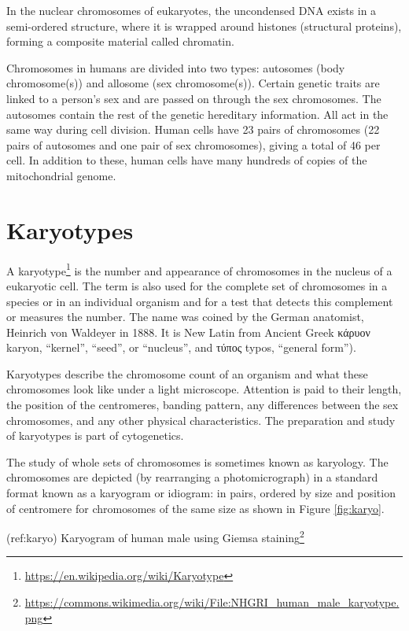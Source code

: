 \documentclass[]{book}
\let\rmarkdownfootnote\footnote%
\def\footnote{\protect\rmarkdownfootnote}
\renewcommand{\href}[2]{#2\footnote{\url{#1}}}
\theoremstyle{definition}
\theoremstyle{definition}
\theoremstyle{definition}
\theoremstyle{remark}
\begin{document}
In the nuclear chromosomes of eukaryotes, the uncondensed DNA exists in
a semi-ordered structure, where it is wrapped around histones
(structural proteins), forming a composite material called chromatin.

Chromosomes in humans are divided into two types: autosomes (body
chromosome(s)) and allosome (sex chromosome(s)). Certain genetic traits
are linked to a person's sex and are passed on through the sex
chromosomes. The autosomes contain the rest of the genetic hereditary
information. All act in the same way during cell division. Human cells
have 23 pairs of chromosomes (22 pairs of autosomes and one pair of sex
chromosomes), giving a total of 46 per cell. In addition to these, human
cells have many hundreds of copies of the mitochondrial genome.

\section{Karyotypes}\label{karyotypes}

A \href{https://en.wikipedia.org/wiki/Karyotype}{karyotype} is the
number and appearance of chromosomes in the nucleus of a eukaryotic
cell. The term is also used for the complete set of chromosomes in a
species or in an individual organism and for a test that detects this
complement or measures the number. The name was coined by the German
anatomist, Heinrich von Waldeyer in 1888. It is New Latin from Ancient
Greek κάρυον karyon, ``kernel'', ``seed'', or ``nucleus'', and τύπος
typos, ``general form'').

Karyotypes describe the chromosome count of an organism and what these
chromosomes look like under a light microscope. Attention is paid to
their length, the position of the centromeres, banding pattern, any
differences between the sex chromosomes, and any other physical
characteristics. The preparation and study of karyotypes is part of
cytogenetics.

The study of whole sets of chromosomes is sometimes known as karyology.
The chromosomes are depicted (by rearranging a photomicrograph) in a
standard format known as a karyogram or idiogram: in pairs, ordered by
size and position of centromere for chromosomes of the same size as
shown in Figure \ref{fig:karyo}.

(ref:karyo)
\href{https://commons.wikimedia.org/wiki/File:NHGRI_human_male_karyotype.png}{Karyogram
of human male using Giemsa staining}
\end{document}
